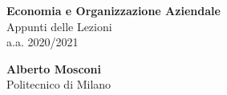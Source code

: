 \documentclass[12pt, letterpaper]{article}
\begin{document}
\begin{titlepage}
    
    \vspace*{2cm}
    
    \begin{center}
        \huge{\bfseries Economia e Organizzazione Aziendale} \\[10pt]
        \Large{Appunti delle Lezioni} \\[10pt]
        \large{a.a. 2020/2021} \\
    \end{center}
    
    \vfill
    
    \begin{flushleft}        
        \large
        \textbf{Alberto Mosconi} \\
        \normalsize
        Politecnico di Milano
    \end{flushleft}
    
\end{titlepage}

\thispagestyle{empty}
\tableofcontents
\newpage

\setcounter{page}{1}



\end{document}
